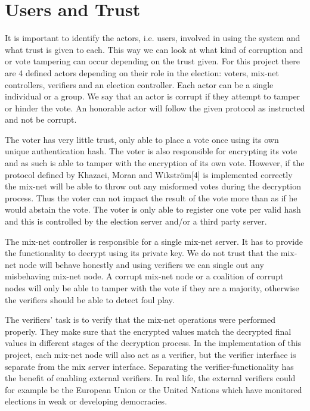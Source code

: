 \documentclass[a4paper,11pt]{kth-mag}
\begin{document}
\section{Users and Trust}
It is important to identify the actors, i.e. users, involved in using the system and what trust is given to each. This way we can look at what kind of corruption and or vote tampering can occur depending on the trust given. For this project there are 4 defined actors depending on their role in the election: voters, mix-net controllers, verifiers and an election controller. Each actor can be a single individual or a group. We say that an actor is corrupt if they attempt to tamper or hinder the vote. An honorable actor will follow the given protocol as instructed and not be corrupt.

The voter has very little trust, only able to place a vote once using its own unique authentication hash. The voter is also responsible for encrypting its vote and as such is able to tamper with the encryption of its own vote. However, if the protocol defined by Khazaei, Moran and Wikström[4] is implemented correctly the mix-net will be able to throw out any misformed votes during the decryption process. Thus the voter can not impact the result of the vote more than as if he would abstain the vote. The voter is only able to register one vote per valid hash and this is controlled by the election server and/or a third party server.

The mix-net controller is responsible for a single mix-net server. It has to provide the functionality to decrypt using its private key. We do not trust that the mix-net node will behave honestly and using verifiers we can single out any misbehaving mix-net node. A corrupt mix-net node or a coalition of corrupt nodes will only be able to tamper with the vote if they are a majority, otherwise the verifiers should be able to detect foul play.

The verifiers' task is to verify that the mix-net operations were performed properly. They make sure that the encrypted values match the decrypted final values in different stages of the decryption process. In the implementation of this project, each mix-net node will also act as a verifier, but the verifier interface is separate from the mix server interface. Separating the verifier-functionality has the benefit of enabling external verifiers. In real life, the external verifiers could for example be the European Union or the United Nations which have monitored elections in weak or developing democracies.
\end{document}
